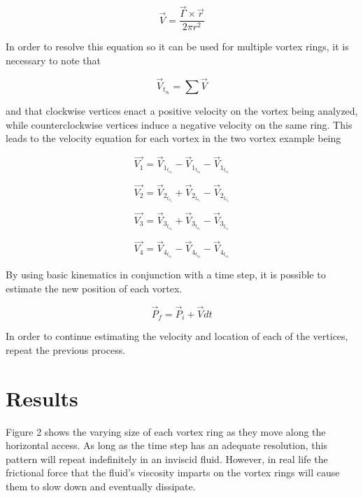 \documentclass{article}
\begin{document}
\begin{multicols}{2}
\begin{equation}
\vec{V} = \frac{\vec{\Gamma} \times \vec{r}}{2\pi r^2}
\end{equation}

In order to resolve this equation so it can be used for multiple vortex rings, it is necessary to note that

\begin{equation}
\vec{V}_t_o_t = \sum \vec{V}
\end{equation}

and that clockwise vertices enact a positive velocity on the vortex being analyzed, while counterclockwise vertices induce a negative velocity on the same ring. This leads to the velocity equation for each vortex in the two vortex example being

\begin{equation}
\vec{V_1} = \vec{V}_1_t_o_4 - \vec{V}_1_t_o_2 - \vec{V}_1_t_o_3
\end{equation}

\begin{equation}
\vec{V_2} = \vec{V}_2_t_o_4 + \vec{V}_2_t_o_1 - \vec{V}_2_t_o_3
\end{equation}

\begin{equation}
\vec{V_3} = \vec{V}_3_t_o_4 + \vec{V}_3_t_o_1 - \vec{V}_3_t_o_1
\end{equation}

\begin{equation}
\vec{V_4} = \vec{V}_4_t_o_1 - \vec{V}_4_t_o_2 - \vec{V}_4_t_o_3
\end{equation}

By using basic kinematics in conjunction with a time step, it is possible to estimate the new position of each vortex.

\begin{equation}
\vec{P}_f = \vec{P}_i +\vec{V}dt
\end{equation}

In order to continue estimating the velocity and location of each of the vertices, repeat the previous process.

\section{Results}
Figure 2 shows the varying size of each vortex ring as they move along the horizontal access. As long as the time step has an adequate resolution, this pattern will repeat indefinitely in an inviscid fluid. However, in real life the frictional force that the fluid's viscosity imparts on the vortex rings will cause them to slow down and eventually dissipate.
\begin{center}


\end{center}
\end{multicols}
\end{document}
